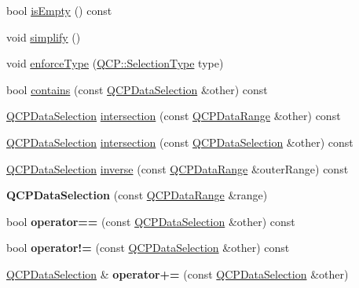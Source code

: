 \begin{DoxyCompactItemize}
bool \hyperlink{class_q_c_p_data_selection_a9d77ad4a54418bd0b74ef6b8076561d0}{is\+Empty} () const 
\item 
void \hyperlink{class_q_c_p_data_selection_a4a2fbad1a6e4d1dd26fdfdf88956f2a4}{simplify} ()
\item 
void \hyperlink{class_q_c_p_data_selection_a17b84d852911531d229f4a76aa239a75}{enforce\+Type} (\hyperlink{namespace_q_c_p_ac6cb9db26a564b27feda362a438db038}{Q\+C\+P\+::\+Selection\+Type} type)
\item 
bool \hyperlink{class_q_c_p_data_selection_a6d7c10d033031c7d1c66948ab8beab0f}{contains} (const \hyperlink{class_q_c_p_data_selection}{Q\+C\+P\+Data\+Selection} \&other) const 
\item 
\hyperlink{class_q_c_p_data_selection}{Q\+C\+P\+Data\+Selection} \hyperlink{class_q_c_p_data_selection_a08371e0e97001f5f688047223123958b}{intersection} (const \hyperlink{class_q_c_p_data_range}{Q\+C\+P\+Data\+Range} \&other) const 
\item 
\hyperlink{class_q_c_p_data_selection}{Q\+C\+P\+Data\+Selection} \hyperlink{class_q_c_p_data_selection_adc25bacbc7268595b684ab060de351d7}{intersection} (const \hyperlink{class_q_c_p_data_selection}{Q\+C\+P\+Data\+Selection} \&other) const 
\item 
\hyperlink{class_q_c_p_data_selection}{Q\+C\+P\+Data\+Selection} \hyperlink{class_q_c_p_data_selection_a02c6253d87d72b8defbee2e6bfa8a494}{inverse} (const \hyperlink{class_q_c_p_data_range}{Q\+C\+P\+Data\+Range} \&outer\+Range) const 
\item 
{\bfseries Q\+C\+P\+Data\+Selection} (const \hyperlink{class_q_c_p_data_range}{Q\+C\+P\+Data\+Range} \&range)\hypertarget{class_q_c_p_data_selection_a738dfb4f5718c5df5ed35ea33ac37818}{}\label{class_q_c_p_data_selection_a738dfb4f5718c5df5ed35ea33ac37818}

\item 
bool {\bfseries operator==} (const \hyperlink{class_q_c_p_data_selection}{Q\+C\+P\+Data\+Selection} \&other) const \hypertarget{class_q_c_p_data_selection_a2489ba93bca3f4f5dc5951eff7d84300}{}\label{class_q_c_p_data_selection_a2489ba93bca3f4f5dc5951eff7d84300}

\item 
bool {\bfseries operator!=} (const \hyperlink{class_q_c_p_data_selection}{Q\+C\+P\+Data\+Selection} \&other) const \hypertarget{class_q_c_p_data_selection_afade4352fad85f165fa29797d5943330}{}\label{class_q_c_p_data_selection_afade4352fad85f165fa29797d5943330}

\item 
\hyperlink{class_q_c_p_data_selection}{Q\+C\+P\+Data\+Selection} \& {\bfseries operator+=} (const \hyperlink{class_q_c_p_data_selection}{Q\+C\+P\+Data\+Selection} \&other)\hypertarget{class_q_c_p_data_selection_a4489657a10fc18b3e5b123f2a1d049cc}{}\label{class_q_c_p_data_selection_a4489657a10fc18b3e5b123f2a1d049cc}


\end{DoxyCompactItemize}
